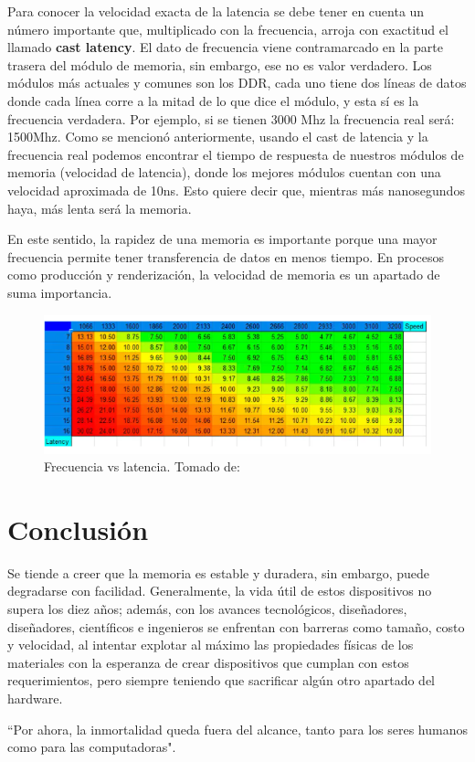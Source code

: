 \documentclass{article}
\begin{document}
Para conocer la velocidad exacta de la latencia se debe tener en cuenta un número importante que, multiplicado con la frecuencia, arroja con exactitud el llamado \textbf{cast latency}. El dato de frecuencia viene contramarcado en la parte trasera del módulo de memoria, sin embargo, ese no es valor verdadero. Los módulos más actuales y comunes son los DDR, cada uno tiene dos líneas de datos donde cada línea corre a la mitad de lo que dice el módulo, y esta sí es la frecuencia verdadera. Por ejemplo, si se tienen 3000 Mhz la frecuencia real será: 1500Mhz. Como se mencionó anteriormente, usando el cast de latencia y la frecuencia real podemos encontrar el tiempo de respuesta de nuestros módulos de memoria (velocidad de latencia), donde los mejores módulos cuentan con una velocidad aproximada de 10ns. Esto quiere decir que, mientras más nanosegundos haya, más lenta será la memoria.
\vspace{0.2cm}

En este sentido, la rapidez de una memoria es importante porque una mayor frecuencia permite tener transferencia de datos en menos tiempo. En procesos como producción y renderización, la velocidad de memoria es un apartado de suma importancia.

\begin{figure}[h]
\includegraphics[width=12cm]{latencia.PNG}
\centering
\caption{Frecuencia vs latencia. Tomado de:\cite{Frecuencia}}
\label{latencia.PNG}
\end{figure}
\newpage
\section{Conclusión}
Se tiende a creer que la memoria es estable y duradera, sin embargo, puede degradarse con facilidad. Generalmente, la vida útil de estos dispositivos no supera los diez años; además, con los avances tecnológicos, diseñadores, diseñadores, científicos e ingenieros se enfrentan con barreras como tamaño, costo y velocidad, al intentar explotar al máximo las propiedades físicas de los materiales con la esperanza de crear dispositivos que cumplan con estos requerimientos, pero siempre teniendo que sacrificar algún otro apartado del hardware.
\vspace{0.2cm}

 ``Por ahora, la inmortalidad queda fuera del alcance, tanto para los seres humanos como para las computadoras"\cite[How computer memory works. 4:39]{TEDwebsite}.



\newpage


\end{document}
